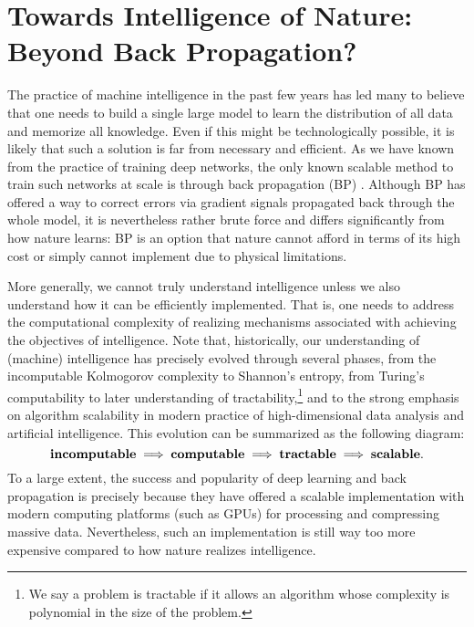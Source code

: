 \documentclass[../../book-main.tex]{subfiles}
\begin{document}
\section{Towards Intelligence of Nature: Beyond Back Propagation?}
The practice of machine intelligence in the past few years has led many to believe that one needs to build a single large model to learn the distribution of all data and memorize all knowledge. Even if this might be technologically possible, it is likely that such a solution is far from necessary and efficient. As we have known from the practice of training deep networks, the only known scalable method to train such networks at scale is through back propagation (BP) \cite{Back-Prop}. Although BP has offered a way to correct errors via gradient signals propagated back through the whole model, it is nevertheless rather brute force and differs significantly from how nature learns: BP is an option that nature cannot afford in terms of its high cost or simply cannot implement due to physical limitations. 

More generally, we cannot truly understand intelligence unless we also understand how it can be efficiently implemented. That is, one needs to address the computational complexity of realizing mechanisms associated with achieving the objectives of intelligence. Note that, historically, our understanding of (machine) intelligence has precisely evolved through several phases, from the incomputable Kolmogorov complexity to Shannon's entropy, from Turing's computability to later understanding of tractability,\footnote{We say a problem is tractable if it allows an algorithm whose complexity is polynomial in the size of the problem.} and to the strong emphasis on algorithm scalability in modern practice of high-dimensional data analysis \cite{Wright-Ma-2022} and artificial intelligence. This evolution can be summarized as the following diagram:
\begin{equation}
   \mbox{\textbf{incomputable}} \;
   \Longrightarrow \; \mbox{\textbf{computable}} \;
   \Longrightarrow \; \mbox{\textbf{tractable}} \; \Longrightarrow \; 
   \mbox{\textbf{scalable}}.
\end{equation}
To a large extent, the success and popularity of deep learning and back propagation is precisely because they have offered a  scalable implementation with modern computing platforms (such as GPUs) for processing and compressing massive data. Nevertheless, such an implementation is still way too more expensive compared to how nature realizes intelligence. 
\end{document}
